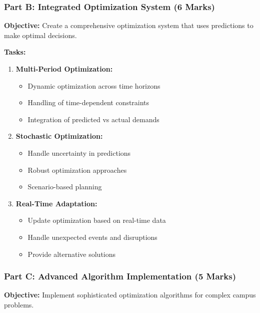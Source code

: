 \documentclass[
  letterpaper,
  DIV=11,
  numbers=noendperiod]{scrreprt}
\providecommand{\tightlist}{%
  \setlength{\itemsep}{0pt}\setlength{\parskip}{0pt}}
\begin{document}
\subsubsection{Part B: Integrated Optimization System (6
Marks)}\label{part-b-integrated-optimization-system-6-marks}

\textbf{Objective:} Create a comprehensive optimization system that uses
predictions to make optimal decisions.

\textbf{Tasks:}

\begin{enumerate}
\def\labelenumi{\arabic{enumi}.}
\item
  \textbf{Multi-Period Optimization:}

  \begin{itemize}
  \tightlist
  \item
    Dynamic optimization across time horizons
  \item
    Handling of time-dependent constraints
  \item
    Integration of predicted vs actual demands
  \end{itemize}
\item
  \textbf{Stochastic Optimization:}

  \begin{itemize}
  \tightlist
  \item
    Handle uncertainty in predictions
  \item
    Robust optimization approaches
  \item
    Scenario-based planning
  \end{itemize}
\item
  \textbf{Real-Time Adaptation:}

  \begin{itemize}
  \tightlist
  \item
    Update optimization based on real-time data
  \item
    Handle unexpected events and disruptions
  \item
    Provide alternative solutions
  \end{itemize}
\end{enumerate}

\subsubsection{Part C: Advanced Algorithm Implementation (5
Marks)}\label{part-c-advanced-algorithm-implementation-5-marks}

\textbf{Objective:} Implement sophisticated optimization algorithms for
complex campus problems.
\end{document}
